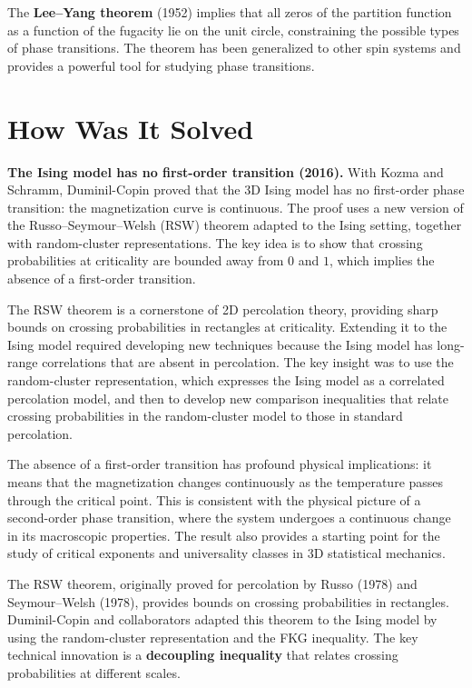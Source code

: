 The \textbf{Lee--Yang theorem} (1952) implies that all zeros of the partition function as a function of the fugacity lie on the unit circle, constraining the possible types of phase transitions. The theorem has been generalized to other spin systems and provides a powerful tool for studying phase transitions.

\section{How Was It Solved}

\textbf{The Ising model has no first-order transition (2016).} With Kozma and Schramm, Duminil-Copin proved that the 3D Ising model has no first-order phase transition: the magnetization curve is continuous. The proof uses a new version of the Russo--Seymour--Welsh (RSW) theorem adapted to the Ising setting, together with random-cluster representations. The key idea is to show that crossing probabilities at criticality are bounded away from $0$ and $1$, which implies the absence of a first-order transition.

The RSW theorem is a cornerstone of 2D percolation theory, providing sharp bounds on crossing probabilities in rectangles at criticality. Extending it to the Ising model required developing new techniques because the Ising model has long-range correlations that are absent in percolation. The key insight was to use the random-cluster representation, which expresses the Ising model as a correlated percolation model, and then to develop new comparison inequalities that relate crossing probabilities in the random-cluster model to those in standard percolation.

The absence of a first-order transition has profound physical implications: it means that the magnetization changes continuously as the temperature passes through the critical point. This is consistent with the physical picture of a second-order phase transition, where the system undergoes a continuous change in its macroscopic properties. The result also provides a starting point for the study of critical exponents and universality classes in 3D statistical mechanics.

The RSW theorem, originally proved for percolation by Russo (1978) and Seymour--Welsh (1978), provides bounds on crossing probabilities in rectangles. Duminil-Copin and collaborators adapted this theorem to the Ising model by using the random-cluster representation and the FKG inequality. The key technical innovation is a \textbf{decoupling inequality} that relates crossing probabilities at different scales.


